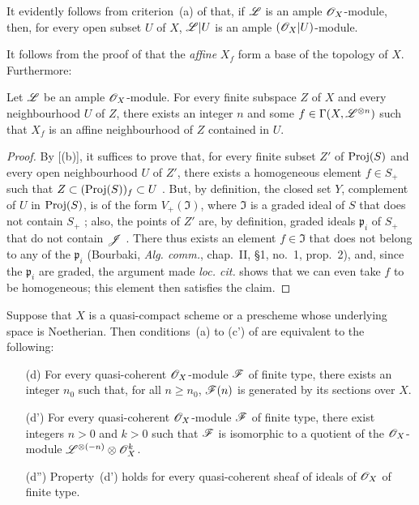 It evidently follows from criterion~(a) of  that, if $\mathscr{L}$ is an ample $\mathscr{O}_X$-module, then, for every open subset $U$ of $X$, $\mathscr{L}|U$ is an ample $(\mathscr{O}_X|U)$-module.

It follows from the proof of  that the \emph{affine} $X_f$ form a base of the topology of $X$.
Furthermore:

\begin{corollary}[4.5.4]
\label{II.4.5.4}
Let $\mathscr{L}$ be an ample $\mathscr{O}_X$-module.
For every finite subspace $Z$ of $X$ and every neighbourhood $U$ of $Z$, there exists an integer $n$ and some $f\in\Gamma(X,\mathscr{L}^{\otimes n})$ such that $X_f$ is an affine neighbourhood of $Z$ contained in $U$.
\end{corollary}

\begin{proof}
By [(b)], it suffices to prove that, for every finite subset $Z'$ of $\operatorname{Proj}(S)$ and every open neighbourhood $U$ of $Z'$, there exists a homogeneous element $f\in S_+$ such that $Z\subset(\operatorname{Proj}(S))_f\subset U$ .
But, by definition, the closed set $Y$, complement of $U$ in $\operatorname{Proj}(S)$, is of the form $V_+(\mathfrak{I})$, where $\mathfrak{I}$ is a graded ideal of $S$ that does not contain $S_+$ ;
also, the points of $Z'$ are, by definition, graded ideals $\mathfrak{p}_i$ of $S_+$ that do not contain $\mathscr{J}$ .
There thus exists an element $f\in\mathfrak{I}$ that does not belong to any of the $\mathfrak{p}_i$ (Bourbaki, \emph{Alg. comm.}, chap.~II, \S1, no.~1, prop.~2), and, since the $\mathfrak{p}_i$ are graded, the argument made \emph{loc. cit.} shows that we can even take $f$ to be homogeneous;
this element then satisfies the claim.
\end{proof}

\begin{proposition}[4.5.5]
\label{II.4.5.5}
Suppose that $X$ is a quasi-compact scheme or a prescheme whose underlying space is Noetherian.
Then conditions~(a) to (c') of  are equivalent to the following:
\begin{enumerate}
  \item[\rm{(d)}] For every quasi-coherent $\mathscr{O}_X$-module $\mathscr{F}$ of finite type, there exists an integer $n_0$ such that, for all $n\geq n_0$, $\mathscr{F}(n)$ is generated by its sections over $X$.
  \item[\rm{(d')}] For every quasi-coherent $\mathscr{O}_X$-module $\mathscr{F}$ of finite type, there exist integers $n>0$ and $k>0$ such that $\mathscr{F}$ is isomorphic to a quotient of the $\mathscr{O}_X$-module $\mathscr{L}^{\otimes(-n)}\otimes\mathscr{O}_X^k$.
  \item[\rm{(d'')}] Property~(d') holds for every quasi-coherent sheaf of ideals of $\mathscr{O}_X$ of finite type.
\end{enumerate}
\end{proposition}

